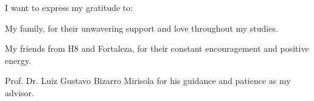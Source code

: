 I want to express my gratitude to:

My family, for their unwavering support and love throughout my studies.

My friends from H8 and Fortaleza, for their constant encouragement and positive energy.

Prof. Dr. Luiz Gustavo Bizarro Mirisola for his guidance and patience as my advisor.

